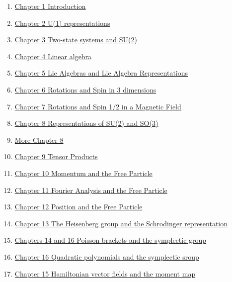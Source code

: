 \documentclass[11pt]{article}
\begin{document}
\begin{enumerate}
	\item	\href{https://mp.weixin.qq.com/s/AVsbrxdxmHO16j3e9DGe_Q}{Chapter 1 Introduction}	%
	\item	\href{https://mp.weixin.qq.com/s/i8jsbsNZlErkQwV0kbWb7g}{Chapter 2 U(1) representations}	%
	\item	\href{https://mp.weixin.qq.com/s/PQ4r-H5ETEvQODC_QP6v6A}{Chapter 3 Two-state systems and SU(2)} 	%
	\item 	\href{https://mp.weixin.qq.com/s/BHjWSOJbg72PecSJ1KFd2Q}{Chapter 4 Linear algebra}	%
	\item 	\href{https://mp.weixin.qq.com/s/BAntdag4E8zQ-juFwX3vFQ}{Chapter 5 Lie Algebras and Lie Algebra Representations}	%
	\item 	\href{https://mp.weixin.qq.com/s/xSHPFtUIHHqQ-mcK6-8eUA}{Chapter 6 Rotations and Spin in 3 dimensions}	%
	\item 	\href{https://mp.weixin.qq.com/s/JdQjI7hn4LQdPA2tcQApIw}{Chapter 7 Rotations and Spin 1/2 in a Magnetic Field}	%
	\item 	\href{https://mp.weixin.qq.com/s/vumo2fZjTn1Tn6rFusOOjw}{Chapter 8 Representations of SU(2) and SO(3)}	%
	\item 	\href{https://mp.weixin.qq.com/s/P2lYbqNibeQu1HLIn9SdPQ}{More Chapter 8}	%
	\item 	\href{https://mp.weixin.qq.com/s/Vdtt2jsHUR_9jWFlqANZQA}{Chapter 9 Tensor Products}	%
	\item	\href{https://mp.weixin.qq.com/s/YzXCxX9bVWQnEUbNsPxkZQ}{Chapter 10 Momentum and the Free Particle}	%
	\item	\href{https://mp.weixin.qq.com/s/VvV9WStayocBvbtm5OfL4g}{Chapter 11 Fourier Analysis and the Free Particle}	%
	\item	\href{https://mp.weixin.qq.com/s/1rcRV3PEPB5fNAVOlqhA-g}{Chapter 12 Position and the Free Particle} 	%
	\item 	\href{https://mp.weixin.qq.com/s/2DCZFJARzstU-SJzF_hA6Q}{Chapter 13 The Heisenberg group and the Schrodinger representation}	%
	\item 	\href{https://mp.weixin.qq.com/s/4OYeYodv5JwS0wi4jCri5A}{Chapters 14 and 16 Poisson brackets and the symplectic group}	%
	\item 	\href{https://mp.weixin.qq.com/s/u_Jr-NEKvJ4ipvtwz1FEWg}{Chapter 16 Quadratic polynomials and the symplectic sroup}	%
	\item 	\href{https://mp.weixin.qq.com/s/AZzDl7Bo3gWkKKWkqMlEJA}{Chapter 15 Hamiltonian vector fields and the moment map}	%

\end{enumerate}
\end{document}
